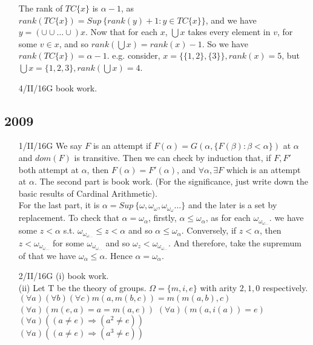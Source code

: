 \begin{enumerate}
    The rank of $TC\{x\}$ is $\alpha -1$, as $rank(TC\{x\})=Sup~\{rank(y)+1: y \in TC\{x\}\}$, and we have $y = (\cup \cup \ldots \cup)x$. Now that for each $x$, $\bigcup x$ takes every element in $v$, for some $v \in x$, and so $rank(\bigcup x)=rank(x)-1$. So we have $rank(TC\{x\})=\alpha -1$. e.g. consider, $x=\{\{1,2\},\{3\}\}, rank(x)=5$, but $\bigcup x=\{1,2,3\}, rank(\bigcup x)=4$.\\
\item[4/II/16G] book work.
\end{enumerate}
\subsection{2009}
\begin{enumerate}
\item[1/II/16G] We say $F$ is an attempt if $F(\alpha)=G(\alpha, \{F(\beta): \beta < \alpha\})$ at $\alpha$ and $dom(F)$ is transitive. Then we can check by induction that, if $F,F'$ both attempt at $\alpha$, then $F(\alpha)=F'(\alpha)$, and $\forall \alpha, \exists F$ which is an attempt at $\alpha$.
    The second part is book work. (For the significance, just write down the basic results of Cardinal Arithmetic).\\
    For the last part, it is $\alpha= Sup~\{\omega,\omega_\omega,\omega_{\omega_\omega} \ldots\}$ and the later is a set by replacement. To check that $\alpha=\omega_\alpha$, firstly, $\alpha \le \omega_\alpha$, as for each $\omega_{\omega_{\omega \ldots}}$. we have some $z < \alpha$ s.t. $\omega_{\omega_{\omega \ldots}} \le z < \alpha$ and so $\alpha \le \omega_\alpha$.  Conversely, if $z < \alpha$, then $z < \omega_{\omega_{\omega \ldots}}$ for some $\omega_{\omega_{\omega \ldots}}$ and so $\omega_z < \omega_{\omega_{\omega \ldots}}$. And therefore, take the supremum of that we have $\omega_\alpha \le \alpha$. Hence $\alpha=\omega_\alpha$.\\
\item[2/II/16G] (i) book work.\\
      (ii) Let T be the theory of groups. $\Omega=\{m,i,e\}$ with arity $2,1,0$ respectively.\\
      $(\forall a)(\forall b)(\forall c)m(a,m(b,c))=m(m(a,b),c)$\\
      $(\forall a)(m(e,a)=a=m(a,e))$
      $(\forall a)(m(a,i(a))=e)$\\
      $(\forall a)((a \neq e) \Rightarrow (a^2 \neq e))$\\
      $(\forall a)((a \neq e) \Rightarrow (a^3 \neq e))$\\

\end{enumerate}
